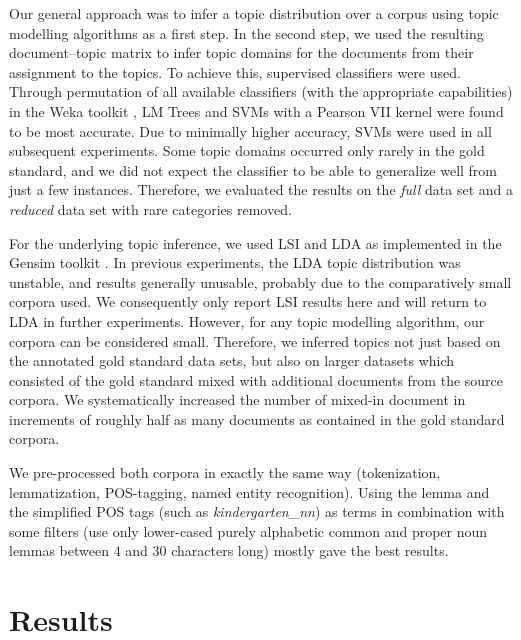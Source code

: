 \documentclass[11pt]{article}
\begin{document}
Our general approach was to infer a topic distribution over a corpus using topic modelling algorithms as a first step.
In the second step, we used the resulting document--topic matrix to infer topic domains for the documents from their assignment to the topics.
To achieve this, supervised classifiers were used.
Through permutation of all available classifiers (with the appropriate capabilities) in the Weka toolkit \cite{HallWitten2011}, LM Trees \cite{LandwehrEa2005} and SVMs with a Pearson VII kernel \cite{UstunEa2006} were found to be most accurate.
Due to minimally higher accuracy, SVMs were used in all subsequent experiments.
Some topic domains occurred only rarely in the gold standard, and we did not expect the classifier to be able to generalize well from just a few instances.
Therefore, we evaluated the results on the \textit{full} data set and a \textit{reduced} data set with rare categories removed.

For the underlying topic inference, we used LSI and LDA as implemented in the Gensim toolkit \cite{RehurekSojka2010}.
In previous experiments, the LDA topic distribution was unstable, and results generally unusable, probably due to the comparatively small corpora used.
We consequently only report LSI results here and will return to LDA in further experiments.
However, for any topic modelling algorithm, our corpora can be considered small.
Therefore, we inferred topics not just based on the annotated gold standard data sets, but also on larger datasets which consisted of the gold standard mixed with additional documents from the source corpora.
We systematically increased the number of mixed-in document in increments of roughly half as many documents as contained in the gold standard corpora.

We pre-processed both corpora in exactly the same way (tokenization, lemmatization, POS-tagging, named entity recognition).
Using the lemma and the simplified POS tags (such as \textit{kindergarten\_nn}) as terms in combination with some filters (use only lower-cased purely alphabetic common and proper noun lemmas between 4 and 30 characters long) mostly gave the best results.

\section{Results}
\label{sec:results}
\end{document}
